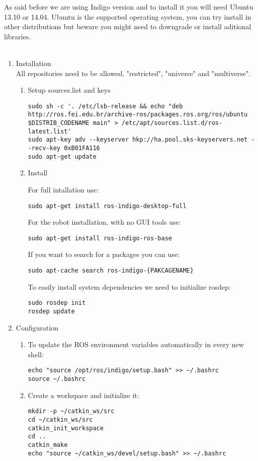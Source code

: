 \documentclass{article}
\begin{document}
As said before we are using Indigo version and to install it you will need
Ubuntu 13.10 or 14.04. Ubuntu is the supported operating system, you can try
install in other distributions but beware you might need to downgrade or install
aditional libraries.
\\
\\
\begin{enumerate}

\item Installation
\\
All repositories need to be allowed, "restricted", "universe" and "multiverse".
\begin{enumerate}
\item Setup sources.list and keys
\begin{lstlisting}
sudo sh -c '. /etc/lsb-release && echo "deb http://ros.fei.edu.br/archive-ros/packages.ros.org/ros/ubuntu $DISTRIB_CODENAME main" > /etc/apt/sources.list.d/ros-latest.list'
sudo apt-key adv --keyserver hkp://ha.pool.sks-keyservers.net --recv-key 0xB01FA116
sudo apt-get update

\end{lstlisting}

\item Install

For full intallation use:
\begin{lstlisting}
sudo apt-get install ros-indigo-desktop-full
\end{lstlisting}
For the robot installation, with no GUI tools use:
\begin{lstlisting}
sudo apt-get install ros-indigo-ros-base
\end{lstlisting}
If you want to search for a packages you can use:
\begin{lstlisting}
sudo apt-cache search ros-indigo-{PAKCAGENAME}
\end{lstlisting}
To easily install system dependencies we need to initialize rosdep:
\begin{lstlisting}
sudo rosdep init
rosdep update
\end{lstlisting}
\end{enumerate}

\item Configuration
\begin{enumerate}
\item To update the ROS environment variables automatically in every new shell:
\begin{lstlisting}
echo "source /opt/ros/indigo/setup.bash" >> ~/.bashrc
source ~/.bashrc
\end{lstlisting}
\item Create a workspace and initialize it:
\begin{lstlisting}
mkdir -p ~/catkin_ws/src
cd ~/catkin_ws/src
catkin_init_workspace
cd ..
catkin_make
echo "source ~/catkin_ws/devel/setup.bash" >> ~/.bashrc
\end{lstlisting}
\end{enumerate}


\end{enumerate}
\end{document}
